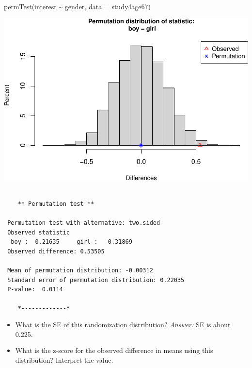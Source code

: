 \documentclass[
]{book}
\newenvironment{Shaded}{\begin{snugshade}}{\end{snugshade}}
\newcommand{\AttributeTok}[1]{\textcolor[rgb]{0.77,0.63,0.00}{#1}}
\newcommand{\FunctionTok}[1]{\textcolor[rgb]{0.00,0.00,0.00}{#1}}
\newcommand{\NormalTok}[1]{#1}
\newcommand{\SpecialCharTok}[1]{\textcolor[rgb]{0.00,0.00,0.00}{#1}}
\providecommand{\tightlist}{%
  \setlength{\itemsep}{0pt}\setlength{\parskip}{0pt}}
\begin{document}
\begin{Shaded}
\begin{Highlighting}[]
\FunctionTok{permTest}\NormalTok{(interest }\SpecialCharTok{\textasciitilde{}}\NormalTok{ gender, }\AttributeTok{data =}\NormalTok{ study4age67)}
\end{Highlighting}
\end{Shaded}

\includegraphics[width=1\linewidth]{Class_Activity_14_files/figure-latex/unnamed-chunk-7-2}

\begin{verbatim}

    ** Permutation test **

 Permutation test with alternative: two.sided 
 Observed statistic
  boy :  0.21635     girl :  -0.31869 
 Observed difference: 0.53505 

 Mean of permutation distribution: -0.00312 
 Standard error of permutation distribution: 0.22035 
 P-value:  0.0114 

    *-------------*
\end{verbatim}

\begin{itemize}
\tightlist
\item
  What is the SE of this randomization distribution?
  \emph{Answer:} SE is about 0.225.
\end{itemize}

\vspace*{.5in}

\begin{itemize}
\tightlist
\item
  What is the z-score for the observed difference in means using this distribution? Interpret the value.
  \vspace*{.5in}
\end{itemize}
\end{document}
